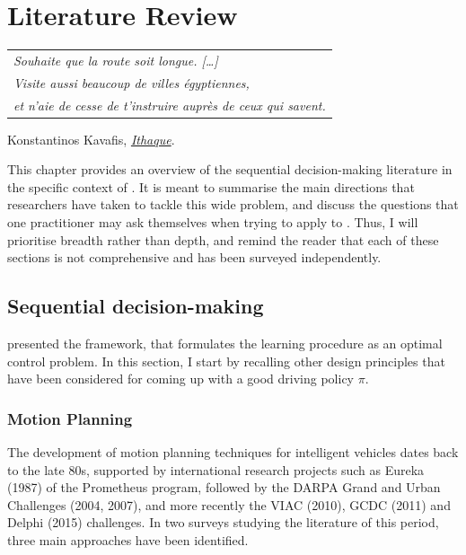 
\graphicspath{{2-Chapters/2-Chapter/}}

\chapter{Literature Review}
\label{chapter:2}

\begin{flushright}
	\begin{tabular}{@{}l@{}}
		\emph{Souhaite que la route soit longue. [\dots]}\\
		\emph{Visite aussi beaucoup de villes égyptiennes,}\\
		\emph{et n’aie de cesse de t’instruire auprès de ceux qui savent.}\\
	\end{tabular}
	
	Konstantinos Kavafis, \href{https://eleurent.github.io/sisyphe/texts/ithaki.html}{\emph{Ithaque}}.
\end{flushright}

\abstractStartChapter{}%
This chapter provides an overview of the sequential decision-making literature in the specific context of . It is meant to summarise the main directions that researchers have taken to tackle this wide problem, and discuss the questions that one practitioner may ask themselves when trying to apply  to . Thus, I will prioritise breadth rather than depth, and remind the reader that each of these sections is not comprehensive and has been surveyed independently.
\minitocStartChapter{}

\section{Sequential decision-making}
\label{sec:sequential-decision-making}

 presented the  framework, that formulates the learning procedure as an optimal control problem. In this section, I start by recalling other design principles that have been considered for coming up with a good driving policy $\pi$.

\subsection{Motion Planning}

The development of motion planning techniques for intelligent vehicles dates back to the late 80s, supported by international research projects such as Eureka (1987) of the Prometheus program, followed by the DARPA Grand and Urban Challenges (2004, 2007), and more recently the VIAC (2010), GCDC (2011) and Delphi (2015) challenges. In two surveys \citep{Gonzalez2016,Paden2016} studying the literature of this period, three main approaches have been identified.

